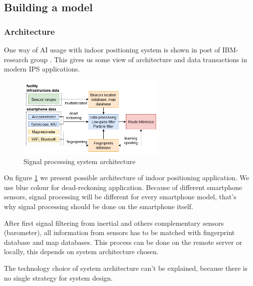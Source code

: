 



\subsection{Building a model}



\subsubsection{Architecture}

One way of AI usage with indoor positioning system is shown in post of IBM-research group \cite{AI-Centric_IPS}. This gives us some view of architecture and data transactions in modern IPS applications.

\begin{figure}[ht]
	\centering
	\includegraphics[width=0.65\textwidth]{graphics/roadmap/indoor navigation roadmap-Page-3.png}
	\caption{Signal processing system architecture}
	\label{fig:arch}
\end{figure}

On figure \ref{fig:arch} we present possible architecture of indoor positioning application.
We use blue colour for dead-reckoning application. Because of different smartphone sensors, signal processing will be different for every smartphone model, that's why signal processing should be done on the smartphone itself.

After first signal filtering from inertial and others complementary sensors (barometer), all information from sensors has to be matched with fingerprint database and map databases. This process can be done on the remote server or locally, this depends on system architecture chosen.

The technology choice of system architecture can't be explained, because there is no single strategy for system design.

